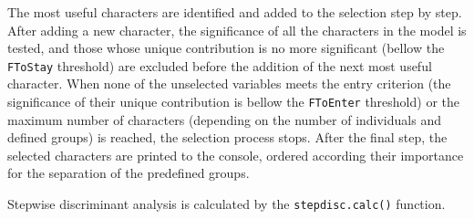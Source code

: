 \documentclass[
  11pt,
  a4paper]{article}
\begin{document}
The most useful characters are identified and added to the selection
step by step. After adding a new character, the significance of all the
characters in the model is tested, and those whose unique contribution
is no more significant (bellow the \texttt{FToStay} threshold) are
excluded before the addition of the next most useful character. When
none of the unselected variables meets the entry criterion (the
significance of their unique contribution is bellow the
\texttt{FToEnter} threshold) or the maximum number of characters
(depending on the number of individuals and defined groups) is reached,
the selection process stops. After the final step, the selected
characters are printed to the console, ordered according their
importance for the separation of the predefined groups.

Stepwise discriminant analysis is calculated by the
\texttt{stepdisc.calc()} function.
\end{document}
